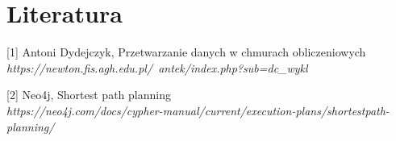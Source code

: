 \documentclass[12pt]{article}
\begin{document}
\section{Literatura}
\begin{description}
\item {[1]} Antoni Dydejczyk, Przetwarzanie danych w chmurach obliczeniowych\\
\textit{https://newton.fis.agh.edu.pl/~antek/index.php?sub=dc\_wykl}
\item {[2]} Neo4j, Shortest path planning\\
\textit{https://neo4j.com/docs/cypher-manual/current/execution-plans/shortestpath-planning/}
\end{description}
\end{document}
